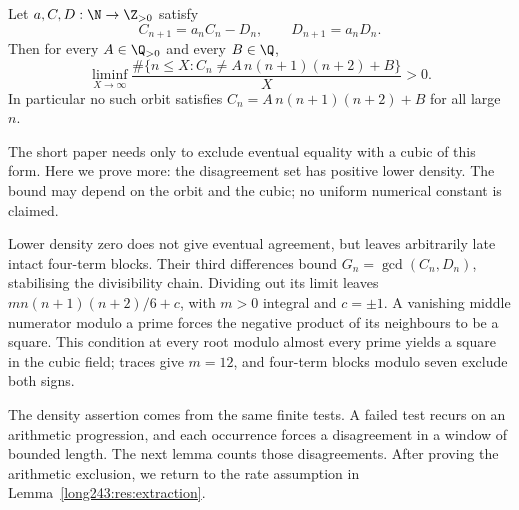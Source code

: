 \begin{theorem}\label{long243:res:cubicexclusion}
Let $a,C,D:\N\to\Z_{>0}$ satisfy
\begin{equation}\label{long243:eq:cubicorbit}
 C_{n+1}=a_nC_n-D_n,\qquad D_{n+1}=a_nD_n .
\end{equation}
Then for every $A\in\Q_{>0}$ and every $B\in\Q$,
\[
 \liminf_{X\to\infty}
 \frac{\#\{n\le X:C_n\ne A\,n(n+1)(n+2)+B\}}{X}>0 .
\]
In particular no such orbit satisfies $C_n=A\,n(n+1)(n+2)+B$ for all
large $n$.
\end{theorem}

The short paper needs only to exclude eventual equality with a cubic
of this form. Here we prove more: the disagreement set has positive
lower density. The bound may depend on the orbit and the cubic; no
uniform numerical constant is claimed.

Lower density zero does not give eventual agreement, but leaves
arbitrarily late intact four-term blocks. Their third differences
bound $G_n=\gcd(C_n,D_n)$, stabilising the divisibility chain. Dividing
out its limit leaves $m n(n+1)(n+2)/6+c$, with $m>0$ integral and
$c=\pm1$. A vanishing middle numerator modulo a prime forces the
negative product of its neighbours to be a square. This condition at
every root modulo almost every prime yields a square in the cubic
field; traces give
$m=12$, and four-term blocks modulo seven exclude both signs.

The density assertion comes from the same finite tests. A failed test
recurs on an arithmetic progression, and each occurrence forces a
disagreement in a window of bounded length. The next lemma counts
those disagreements. After proving the arithmetic exclusion, we return
to the rate assumption in Lemma~\ref{long243:res:extraction}.

